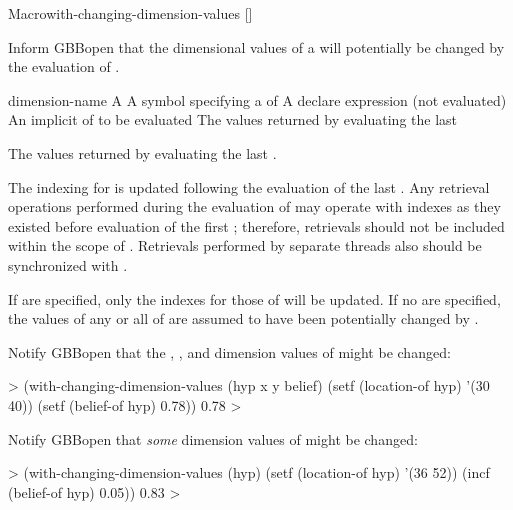 \documentclass[10pt,twoside,english,pdftex]{article}
\begin{document}

\begin{functiondoc}{Macro}{with-changing-dimension-values}%
  {\code{(} 
         [\superstar{}]\code{)}
    \superstar{}
    \superstar{}
    \returns{} \superstar}
%
  
\fnsyntax

\fnpurpose Inform GBBopen that the dimensional values of a
 will potentially be changed by the evaluation of
.

\fnpackage {}

\fnmodule {}

\fnargs
\begin{args}{dimension-name}
 A 
 A symbol specifying a  of
\arg[declaration] A declare expression (not evaluated)
\arg[forms] An implicit  of  to be evaluated
\arg[results] The values returned by evaluating the last 
\end{args}

\fnreturns The values returned by evaluating the last .

\fndescription The indexing for  is updated following the
evaluation of the last .  Any retrieval operations performed during
the evaluation of  may operate with indexes as they existed
before evaluation of the first ; therefore, retrievals should not be
included within the scope of .
Retrievals performed by separate threads also should be synchronized with
.

If  are specified, only the indexes for those
 of  will be updated. If no
 are specified, the values of any or all
 of  are assumed to have been
potentially changed by .

\fnexamples Notify GBBopen that the , , and
 dimension values of  might be changed:
%
\W\supp
\begin{example}
  > (with-changing-dimension-values (hyp x y belief)
      (setf (location-of hyp) '(30 40))
      (setf (belief-of hyp) 0.78))
  0.78
  >
\end{example}
%
Notify GBBopen that \textit{some\/} dimension values of  might be
changed:
%
\W\supp\notpretop
\begin{example}
  > (with-changing-dimension-values (hyp)
      (setf (location-of hyp) '(36 52))
      (incf (belief-of hyp) 0.05))
  0.83
  >
\end{example}

\end{functiondoc}
\end{document}
